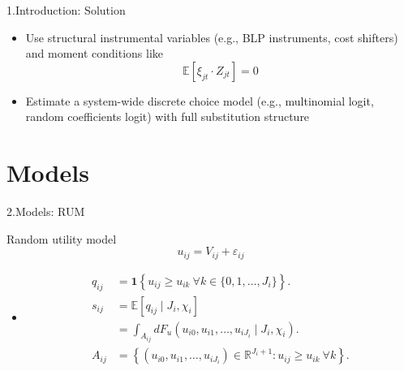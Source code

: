 \documentclass[aspectratio=169]{beamer}  %
\begin{document}
\begin{frame}{1.Introduction: Solution}
    \begin{itemize}
        \item Use structural instrumental variables (e.g., BLP instruments, cost shifters) and moment conditions like
        \begin{equation}
\mathbb{E}[\xi_{jt} \cdot Z_{jt}] = 0 \tag{1.4}
\end{equation}
        \item Estimate a system-wide discrete choice model (e.g., multinomial logit, random coefficients logit) with full substitution structure
    \end{itemize}
\end{frame}

\section{Models}
\begin{frame}{2.Models: RUM}
    \begin{block}{Random utility model}
        \begin{equation*}
    u_{ij} = V_{ij} + \varepsilon_{ij}
\end{equation*}
    \end{block}
    
    \begin{itemize}
        \item 
        \begin{align}
q_{ij} &= \mathbf{1} \left\{ u_{ij} \geq u_{ik} \ \forall k \in \{0, 1, \ldots, J_i\} \right\}\tag{2.1}. \\[1em]
s_{ij} &= \mathbb{E} \left[ q_{ij} \mid J_i, \chi_i \right]\tag{2.2} \\ 
&= \int_{A_{ij}} dF_u \left( u_{i0}, u_{i1}, \ldots, u_{iJ_i} \mid J_i, \chi_i \right)\tag{2.2}. \\[1em]
A_{ij} &= \left\{ \left( u_{i0}, u_{i1}, \ldots, u_{iJ_i} \right) \in \mathbb{R}^{J_i + 1} : u_{ij} \geq u_{ik} \ \forall k \right\}\tag{2.3}.
\end{align}
    \end{itemize}
\end{frame}
\end{document}
